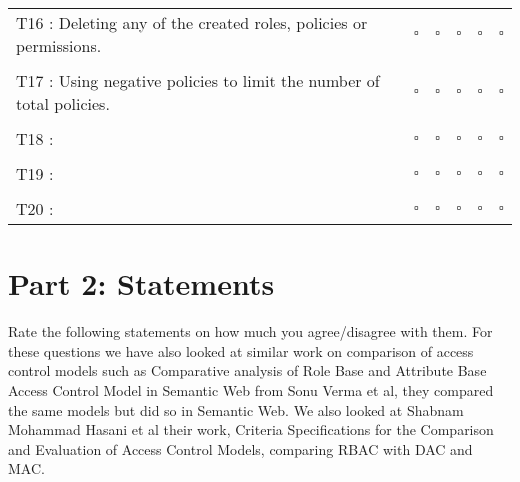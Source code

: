 \begin{tabular}{p{8cm} p{1cm} p{1cm} p{1cm} p{1cm} p{1cm}}
     \\
    T16 : Deleting any of the created roles, policies or permissions.
     & $\square$ & $\square$ & $\square$ & $\square$ & $\square$ \\
     \\
    T17 : Using negative policies to limit the number of total policies.
     & $\square$ & $\square$ & $\square$ & $\square$ & $\square$ \\
     \\
    T18 : 
     & $\square$ & $\square$ & $\square$ & $\square$ & $\square$ \\
     \\
    T19 : 
     & $\square$ & $\square$ & $\square$ & $\square$ & $\square$ \\
     \\
    T20 : 
     & $\square$ & $\square$ & $\square$ & $\square$ & $\square$ \\
\end{tabular}

\clearpage

\hskip-2.5cm\section{Part 2: Statements}
Rate the following statements on how much you agree/disagree with them. 
For these questions we have also looked at similar work on comparison of access control models such as Comparative analysis of Role Base and Attribute Base
Access Control Model in Semantic Web from Sonu Verma et al, they compared the same models but did so in Semantic Web\cite{Related1}. We also looked at Shabnam Mohammad Hasani et al their work, Criteria Specifications for the Comparison and Evaluation of Access Control Models, comparing RBAC with DAC and MAC\cite{Related3}.
 
